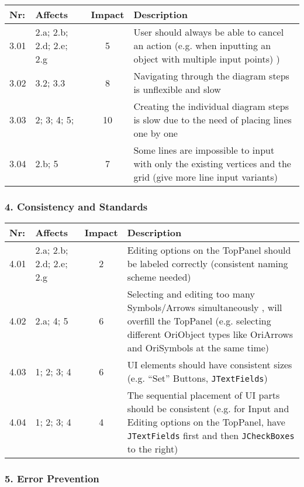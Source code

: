         \begin{tabular}{l | p{} | c | p{}}
        Nr: & Affects & Impact & Description \\ \hline
        3.01 & 2.a; 2.b; 2.d; 2.e; 2.g  & 5 & User should always be able to cancel an action (e.g. when inputting an object with multiple input points) )\\ \hline
        3.02 & 3.2; 3.3 & 8 & Navigating through the diagram steps is unflexible and slow\\ \hline
        3.03 & 2; 3; 4; 5; & 10 & Creating the individual diagram steps is slow due to the need of placing lines one by one\\ \hline
        3.04 & 2.b; 5 & 7 & Some lines are impossible to input with only the existing vertices and the grid (give more line input variants)\\ \hline
        \end{tabular}


\subsubsection*{4. Consistency and Standards}

        \begin{tabular}{l | p{} | c | p{}}
        Nr: & Affects & Impact & Description \\ \hline
        4.01 & 2.a; 2.b; 2.d; 2.e; 2.g  & 2 & Editing options on the TopPanel should be labeled correctly (consistent naming scheme needed)\\ \hline 
	4.02 & 2.a; 4; 5 & 6 & Selecting and editing too many Symbols/Arrows simultaneously , will overfill the TopPanel (e.g. selecting different OriObject types like OriArrows and OriSymbols at the same time)\\ \hline
	4.03 & 1; 2; 3; 4 & 6 & UI elements should have consistent sizes (e.g. ``Set'' Buttons, \texttt{JTextFields})\\ \hline
	4.04 & 1; 2; 3; 4 & 4 & The sequential placement of UI parts should be consistent (e.g. for Input and Editing options on the TopPanel, have \texttt{JTextFields} first and then \texttt{JCheckBoxes} to the right)\\ \hline
        \end{tabular}

\subsubsection*{5. Error Prevention}

